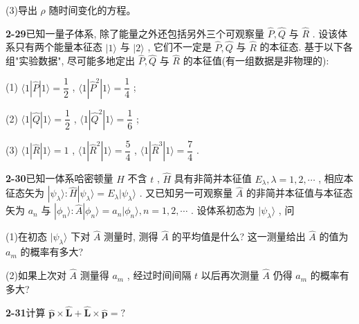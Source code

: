 (3)导出 $\displaystyle \rho$ 随时间变化的方程。

\vfill

\newpage

\textbf{2-29}\quad 已知一量子体系, 除了能量之外还包括另外三个可观察量 $\displaystyle \hat{P}, \hat{Q}$ 与 $\displaystyle \hat{R}$ . 设该体系只有两个能量本征态 $\displaystyle |1\rangle$ 与 $\displaystyle |2\rangle$ , 它们不一定是 $\displaystyle \hat{P}, \hat{Q}$ 与 $\displaystyle \hat{R}$ 的本征态. 基于以下各组"实验数据", 尽可能多地定出 $\displaystyle \hat{P}, \hat{Q}$ 与 $\displaystyle \hat{R}$ 的本征值(有一组数据是非物理的):

(1) $\displaystyle \langle 1|\hat{P}|1\rangle = \dfrac{1}{2}$ , $\displaystyle \langle 1|\hat{P}^2|1\rangle = \dfrac{1}{4}$ ;

(2) $\displaystyle \langle 1|\hat{Q}|1\rangle = \dfrac{1}{2}$ , $\displaystyle \langle 1|\hat{Q}^2|1\rangle = \dfrac{1}{6}$ ;

(3) $\displaystyle \langle 1|\hat{R}|1\rangle = 1$ , $\displaystyle \langle 1|\hat{R}^2|1\rangle = \dfrac{5}{4}$ , $\displaystyle \langle 1|\hat{R}^3|1\rangle = \dfrac{7}{4}$ .

\vfill

\newpage

\textbf{2-30}\quad 已知一体系哈密顿量 $\displaystyle \hat{H}$ 不含 $\displaystyle t$ , $\displaystyle \hat{H}$ 具有非简并本征值 $\displaystyle E_{\lambda}, \lambda = 1, 2, \cdots$ , 相应本征态矢为 $\displaystyle |\psi_{\lambda}\rangle: \hat{H}|\psi_{\lambda}\rangle = E_{\lambda}|\psi_{\lambda}\rangle$ . 又已知另一可观察量 $\displaystyle \hat{A}$ 的非简并本征值与本征态矢为 $\displaystyle a_{n}$ 与 $\displaystyle |\phi_{n}\rangle: \hat{A}|\phi_{n}\rangle = a_{n}|\phi_{n}\rangle, n = 1, 2, \cdots$ . 设体系初态为 $\displaystyle |\psi_{\lambda}\rangle$ , 问

(1)在初态 $\displaystyle |\psi_{\lambda}\rangle$ 下对 $\displaystyle \hat{A}$ 测量时, 测得 $\displaystyle \hat{A}$ 的平均值是什么? 这一测量给出 $\displaystyle \hat{A}$ 的值为 $\displaystyle a_{m}$ 的概率有多大?

(2)如果上次对 $\displaystyle \hat{A}$ 测量得 $\displaystyle a_{m}$ , 经过时间间隔 $\displaystyle t$ 以后再次测量 $\displaystyle \hat{A}$ 仍得 $\displaystyle a_{m}$ 的概率有多大?

\vfill

\newpage

\textbf{2-31}\quad 计算 $\displaystyle \hat{\pmb{p}}\times \hat{\pmb{L}} +\hat{\pmb{L}}\times \hat{\pmb{p}} = ?$

